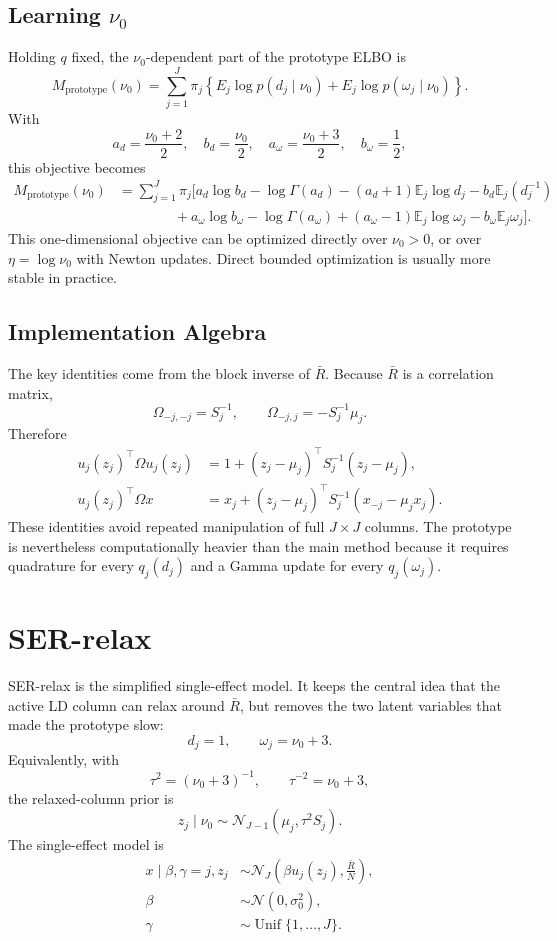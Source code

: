 \documentclass[11pt]{article}
\newcommand{\Rbar}{\bar R}
\newcommand{\Om}{\Omega}
\newcommand{\E}{\mathbb E}
\newcommand{\Unif}{\operatorname{Unif}}
\newcommand{\Normal}{\mathcal N}
\begin{document}
\subsection{\texorpdfstring{Learning \(\nu_0\)}{Learning nu0}}

Holding \(q\) fixed, the \(\nu_0\)-dependent part of the prototype ELBO
is
\[
M_{\mathrm{prototype}}(\nu_0)
=
\sum_{j=1}^J
\pi_j
\left\{
E_j\log p(d_j\mid\nu_0)
+E_j\log p(\omega_j\mid\nu_0)
\right\}.
\]
With
\[
a_d=\frac{\nu_0+2}{2},\quad b_d=\frac{\nu_0}{2},\quad
a_\omega=\frac{\nu_0+3}{2},\quad b_\omega=\frac12,
\]
this objective becomes
\begin{align}
M_{\mathrm{prototype}}(\nu_0)
&=
\sum_{j=1}^J\pi_j
\Big[
a_d\log b_d-\log\Gamma(a_d)
-(a_d+1)\E_j\log d_j
-b_d\E_j(d_j^{-1}) \nonumber\\
&\qquad\qquad
+a_\omega\log b_\omega-\log\Gamma(a_\omega)
+(a_\omega-1)\E_j\log\omega_j
-b_\omega\E_j\omega_j
\Big].
\end{align}
This one-dimensional objective can be optimized directly over
\(\nu_0>0\), or over \(\eta=\log\nu_0\) with Newton updates. Direct
bounded optimization is usually more stable in practice.

\subsection{Implementation Algebra}

The key identities come from the block inverse of \(\Rbar\). Because
\(\Rbar\) is a correlation matrix,
\[
\Om_{-j,-j}=S_j^{-1},\qquad
\Om_{-j,j}=-S_j^{-1}\mu_j.
\]
Therefore
\begin{align}
u_j(z_j)^\top\Om u_j(z_j)
&=
1+(z_j-\mu_j)^\top S_j^{-1}(z_j-\mu_j),\\
u_j(z_j)^\top\Om x
&=
x_j+(z_j-\mu_j)^\top S_j^{-1}(x_{-j}-\mu_jx_j).
\end{align}
These identities avoid repeated manipulation of full \(J\times J\)
columns. The prototype is nevertheless computationally heavier than the
main method because it requires quadrature for every \(q_j(d_j)\) and a
Gamma update for every \(q_j(\omega_j)\).

\section{SER-relax}

SER-relax is the simplified single-effect model. It keeps the central
idea that the active LD column can relax around \(\Rbar\), but removes
the two latent variables that made the prototype slow:
\[
d_j=1,\qquad
\omega_j=\nu_0+3.
\]
Equivalently, with
\[
\tau^2=(\nu_0+3)^{-1},\qquad \tau^{-2}=\nu_0+3,
\]
the relaxed-column prior is
\[
z_j\mid\nu_0\sim
\Normal_{J-1}(\mu_j,\tau^2S_j).
\]
The single-effect model is
\begin{align}
x\mid\beta,\gamma=j,z_j
&\sim
\Normal_J\left(\beta u_j(z_j),\frac{\Rbar}{N}\right),\\
\beta&\sim \Normal(0,\sigma_0^2),\\
\gamma&\sim\Unif\{1,\ldots,J\}.
\end{align}
\end{document}

